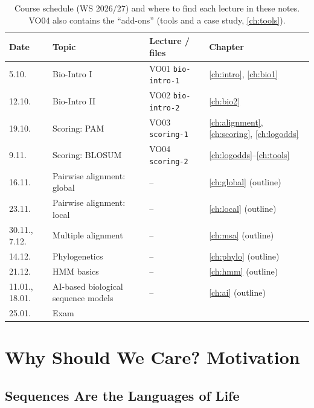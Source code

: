 \documentclass[11pt, oneside]{book}
\let\originalsection\section
\renewcommand{\section}{\Needspace{7\baselineskip}\originalsection}
\let\originalsubsection\subsection
\renewcommand{\subsection}{\Needspace{6\baselineskip}\originalsubsection}
\begin{document}
\begin{table}[htbp]
\centering
\small
\begin{tabular}{@{}llll@{}}
\toprule
\textbf{Date} & \textbf{Topic} & \textbf{Lecture / files} & \textbf{Chapter} \\
\midrule
5.10.  & Bio-Intro I                         & VO01 \texttt{bio-intro-1}  & \ref{ch:intro}, \ref{ch:bio1} \\
12.10. & Bio-Intro II                        & VO02 \texttt{bio-intro-2}  & \ref{ch:bio2} \\
19.10. & Scoring: PAM                        & VO03 \texttt{scoring-1}    & \ref{ch:alignment}, \ref{ch:scoring}, \ref{ch:logodds} \\
9.11.  & Scoring: BLOSUM                     & VO04 \texttt{scoring-2}    & \ref{ch:logodds}--\ref{ch:tools} \\
16.11. & Pairwise alignment: global          & --                          & \ref{ch:global} (outline) \\
23.11. & Pairwise alignment: local           & --                          & \ref{ch:local} (outline) \\
30.11., 7.12. & Multiple alignment           & --                          & \ref{ch:msa} (outline) \\
14.12. & Phylogenetics                       & --                          & \ref{ch:phylo} (outline) \\
21.12. & HMM basics                          & --                          & \ref{ch:hmm} (outline) \\
11.01., 18.01. & AI-based biological sequence models & --              & \ref{ch:ai} (outline) \\
25.01. & Exam                                & & \\
\bottomrule
\end{tabular}
\caption{Course schedule (WS 2026/27) and where to find each lecture in these
notes. VO04 also contains the ``add-ons'' (tools and a case study,
\cref{ch:tools}).}
\label{tab:roadmap}
\end{table}

\section{Why Should We Care? Motivation}

\subsection{Sequences Are the Languages of Life}
\end{document}
